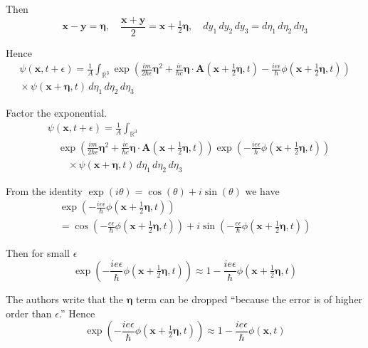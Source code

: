 \documentclass[12pt]{article}
\newcommand\INT{\int_{\mathbb R^3}}
\begin{document}
Then
\begin{equation*}
\mathbf x-\mathbf y=\boldsymbol\eta,\quad
\frac{\mathbf x+\mathbf y}{2}=\mathbf{x}+\tfrac{1}{2}\boldsymbol\eta,\quad
dy_1\,dy_2\,dy_3=d\eta_1\,d\eta_2\,d\eta_3
\end{equation*}

Hence
\begin{multline*}
\psi(\mathbf x,t+\epsilon)=
\frac{1}{A}\INT\exp
\left(
\frac{im}{2\hbar\epsilon}\boldsymbol\eta^2
+\frac{ie}{\hbar c}\boldsymbol\eta\cdot\mathbf A\left(\mathbf x+\tfrac{1}{2}\boldsymbol\eta,t\right)
-\frac{ie\epsilon}{\hbar}\phi\left(\mathbf x+\tfrac{1}{2}\boldsymbol\eta,t\right)
\right)
\\
{}\times\psi(\mathbf x+\boldsymbol\eta,t)
\,d\eta_1\,d\eta_2\,d\eta_3
\end{multline*}

Factor the exponential.
\begin{align*}
&\psi(\mathbf x,t+\epsilon)=
\frac{1}{A}\INT
\\
&\quad{}\exp
\left(
\frac{im}{2\hbar\epsilon}\boldsymbol\eta^2
+\frac{ie}{\hbar c}\boldsymbol\eta\cdot\mathbf A\left(\mathbf x+\tfrac{1}{2}\boldsymbol\eta,t\right)
\right)
\exp\left(-\frac{ie\epsilon}{\hbar}\phi\left(\mathbf x+\tfrac{1}{2}\boldsymbol\eta,t\right)\right)
\\
&\quad\quad{}\times\psi(\mathbf x+\boldsymbol\eta,t)
\,d\eta_1\,d\eta_2\,d\eta_3
\tag{2}
\end{align*}

From the identity $\exp(i\theta)=\cos(\theta)+i\sin(\theta)$ we have
\begin{multline*}
\exp\left(-\frac{ie\epsilon}{\hbar}\phi\left(\mathbf x+\tfrac{1}{2}\boldsymbol\eta,t\right)\right)
\\
=\cos\left(-\frac{e\epsilon}{\hbar}\phi\left(\mathbf x+\tfrac{1}{2}\boldsymbol\eta,t\right)\right)
+i\sin\left(-\frac{e\epsilon}{\hbar}\phi\left(\mathbf x+\tfrac{1}{2}\boldsymbol\eta,t\right)\right)
\end{multline*}

Then for small $\epsilon$
\begin{equation*}
\exp\left(-\frac{ie\epsilon}{\hbar}\phi\left(\mathbf x+\tfrac{1}{2}\boldsymbol\eta,t\right)\right)
\approx
1-\frac{ie\epsilon}{\hbar}\phi\left(\mathbf x+\tfrac{1}{2}\boldsymbol\eta,t\right)
\end{equation*}

The authors write that the $\boldsymbol\eta$ term can be dropped
``because the error is of higher order than $\epsilon$.''
Hence
\begin{equation*}
\exp\left(-\frac{ie\epsilon}{\hbar}\phi\left(\mathbf x+\tfrac{1}{2}\boldsymbol\eta,t\right)\right)
\approx
1-\frac{ie\epsilon}{\hbar}\phi(\mathbf x,t)
\tag{3}
\end{equation*}
\end{document}
